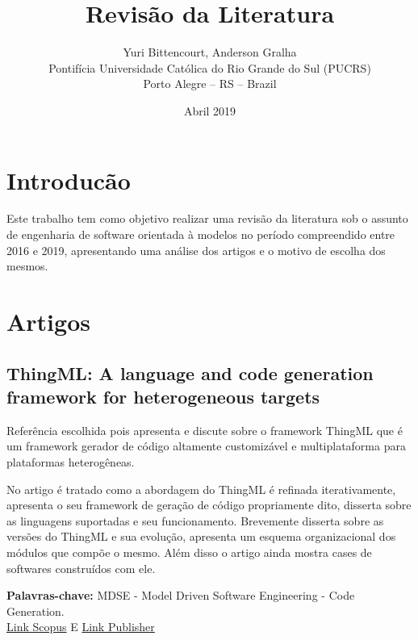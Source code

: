 \documentclass{article}
\title{Revisão da Literatura}
\author{Yuri Bittencourt, Anderson Gralha \\
        Pontifícia Universidade Católica do Rio Grande do Sul 
	(PUCRS) \\ Porto Alegre -- RS -- Brazil
	 }
\date{Abril 2019}
\begin{document}
\maketitle

\section{Introducão}
Este trabalho tem como objetivo realizar uma revisão da literatura sob o assunto de engenharia de software orientada à modelos no período compreendido entre 2016 e 2019, apresentando uma análise dos artigos e o motivo de escolha dos mesmos.

\section{Artigos}
\subsection{ThingML: A language and code generation framework for heterogeneous targets}

Referência escolhida pois apresenta e discute sobre o framework ThingML que é um framework gerador de código altamente customizável e multiplataforma para plataformas heterogêneas. \par
No artigo \citep{Harrand:2016:TLC:2976767.2976812} é tratado  como a abordagem do ThingML é refinada iterativamente, apresenta o seu framework de geração de código propriamente dito, disserta sobre as linguagens suportadas e seu funcionamento. Brevemente disserta sobre as versões do ThingML e sua evolução, apresenta um esquema organizacional dos módulos que compõe o mesmo. Além disso o artigo ainda mostra cases de softwares construídos com ele. \par

\textbf{Palavras-chave:} MDSE - Model Driven Software Engineering - Code Generation.\\
\href{https://www.scopus.com/record/display.uri?eid=2-s2.0-85008457888&origin=resultslist&sort=cp-f&src=s&st1=MDSE+or+22Model+Driven+Software+Engineering%22&nlo=&nlr=&nls=&sid=932f64cfcf6c13206bf91a78ce2f53c8&sot=b&sdt=cl&cluster=scopubyr%2c%222019%22%2ct%2c%222018%22%2ct%2c%222017%22%2ct%2c%222016%22%2ct&sl=58&s=TITLE-ABS-KEY%28MDSE+or+%22Model+Driven+Software+Engineering%22%29&relpos=0&citeCnt=19&searchTerm=}{Link Scopus} 
E \href{https://dl.acm.org/citation.cfm?doid=2976767.2976812}{Link Publisher}
\end{document}
